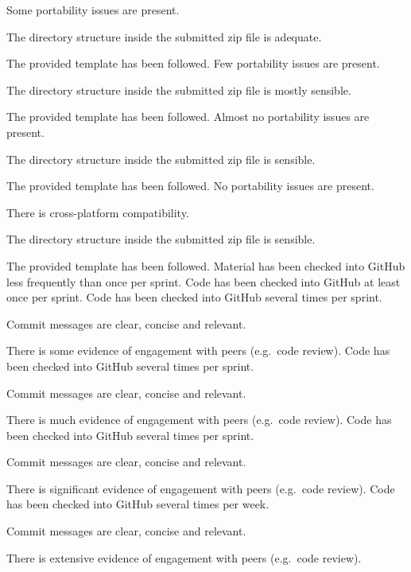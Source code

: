 \documentclass{../../fal_assignment}
\begin{document}
\begin{markingrubric}
        \grade Some portability issues are present.
            \par The directory structure inside the submitted zip file is adequate.
            \par The provided template has been followed.
        \grade Few portability issues are present.
            \par The directory structure inside the submitted zip file is mostly sensible.
            \par The provided template has been followed.
        \grade Almost no portability issues are present.
            \par The directory structure inside the submitted zip file is sensible.
            \par The provided template has been followed.
        \grade No portability issues are present.
            \par There is cross-platform compatibility.
            \par The directory structure inside the submitted zip file is sensible.
            \par The provided template has been followed.
%
        \grade \fail Material has been checked into GitHub less frequently than once per sprint.
        \grade Code has been checked into GitHub at least once per sprint.
        \grade Code has been checked into GitHub several times per sprint.
            \par Commit messages are clear, concise and relevant.
            \par There is some evidence of engagement with peers (e.g.\ code review).
        \grade Code has been checked into GitHub several times per sprint.
            \par Commit messages are clear, concise and relevant.
            \par There is much evidence of engagement with peers (e.g.\ code review).
        \grade Code has been checked into GitHub several times per sprint.
            \par Commit messages are clear, concise and relevant.
            \par There is significant evidence of engagement with peers (e.g.\ code review).
        \grade Code has been checked into GitHub several times per week.
            \par Commit messages are clear, concise and relevant.
            \par There is extensive evidence of engagement with peers (e.g.\ code review).
\end{markingrubric}
\end{document}
